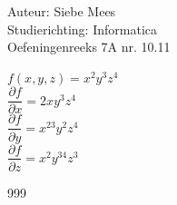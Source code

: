 \documentclass[a4paper]{article}
\begin{document}
  
\noindent \large Auteur: Siebe Mees \\
\noindent \large Studierichting: Informatica\\
\noindent \large Oefeningenreeks 7A nr. 10.11\\

\medskip

\normalsize

$ f(x,y,z)=x^2y^3z^4 $\\

$ \dfrac{\partial f}{\partial x}=2xy^3z^4 $\\

$ \dfrac{\partial f}{\partial y}=x^23y^2z^4 $\\

$ \dfrac{\partial f}{\partial z}=x^2y^34z^3 $\\


\begin{thebibliography}{999}
\end{thebibliography}
\end{document}
